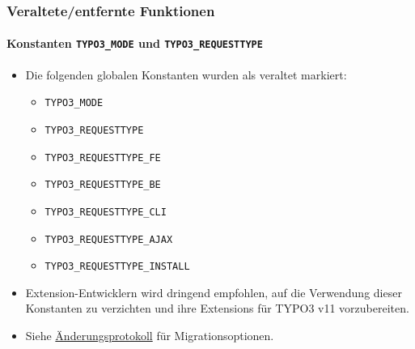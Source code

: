 %

\begin{frame}[fragile]
	\frametitle{Veraltete/entfernte Funktionen}
	\framesubtitle{Konstanten \texttt{TYPO3\_MODE} und \texttt{TYPO3\_REQUESTTYPE}}

	\begin{itemize}
		\item Die folgenden globalen Konstanten wurden als veraltet markiert:
			\begin{itemize}\smaller
				\item \texttt{TYPO3\_MODE}
				\item \texttt{TYPO3\_REQUESTTYPE}
				\item \texttt{TYPO3\_REQUESTTYPE\_FE}
				\item \texttt{TYPO3\_REQUESTTYPE\_BE}
				\item \texttt{TYPO3\_REQUESTTYPE\_CLI}
				\item \texttt{TYPO3\_REQUESTTYPE\_AJAX}
				\item \texttt{TYPO3\_REQUESTTYPE\_INSTALL}
			\end{itemize}\normalsize

		\item Extension-Entwicklern wird dringend empfohlen, auf die Verwendung
			dieser Konstanten zu verzichten und ihre Extensions für TYPO3 v11 vorzubereiten.
		\item Siehe \href{https://docs.typo3.org/c/typo3/cms-core/master/en-us/Changelog/11.0/Deprecation-92947-DeprecateTYPO3_MODEAndTYPO3_REQUESTTYPEConstants.html}{Änderungsprotokoll}
			für Migrationsoptionen.
	\end{itemize}

\end{frame}

